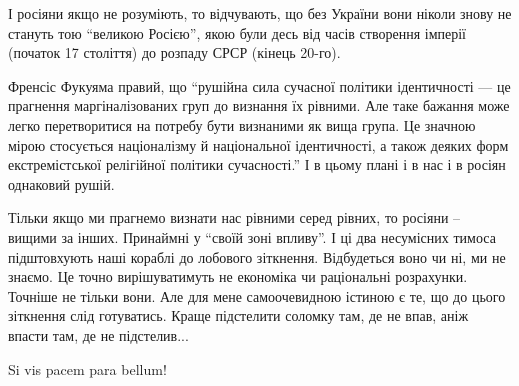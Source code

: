І росіяни якщо не розуміють, то відчувають, що без України вони ніколи знову не
стануть тою \enquote{великою Росією}, якою були десь від часів створення імперії
(початок 17 століття) до розпаду СРСР (кінець 20-го). 

Френсіс Фукуяма правий, що \enquote{рушійна сила сучасної політики ідентичності — це
прагнення маргіналізованих груп до визнання їх рівними. Але таке бажання може
легко перетворитися на потребу бути визнаними як вища група. Це значною мірою
стосується націоналізму й національної ідентичності, а також деяких форм
екстремістської релігійної політики сучасності.} І в цьому плані і в нас і в
росіян однаковий рушій.

Тільки якщо ми прагнемо визнати нас рівними серед рівних, то росіяни – вищими
за інших. Принаймні у \enquote{своїй зоні впливу}. І ці два несумісних тимоса
підштовхують наші кораблі до лобового зіткнення. Відбудеться воно чи ні, ми не
знаємо. Це точно вирішуватимуть не економіка чи раціональні розрахунки. Точніше
не тільки вони. Але для мене самоочевидною істиною є те, що до цього зіткнення
слід готуватись. Краще підстелити соломку там, де не впав, аніж впасти там, де
не підстелив...

Si vis pacem para bellum!

